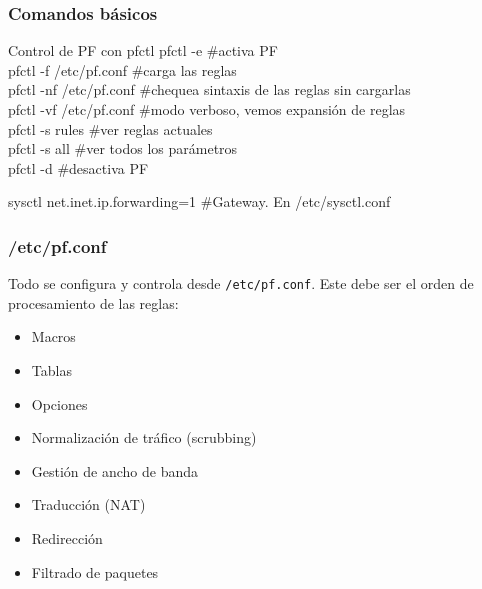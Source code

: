 \documentclass{beamer}
\begin{document}
\begin{frame}
\frametitle{Comandos básicos}


\begin{block}{Control de PF con pfctl}
\alert{pfctl -e} \hspace{4mm} \#activa PF  \\
\alert{pfctl -f /etc/pf.conf} \hspace{2mm} \#carga las reglas \\
\alert{pfctl -nf /etc/pf.conf} \#chequea sintaxis de las reglas sin cargarlas \\
\alert{pfctl -vf /etc/pf.conf} \#modo verboso, vemos expansión de reglas\\
\alert{pfctl -s rules} \hspace{2mm} \#ver reglas actuales \\
\alert{pfctl -s all} \hspace{2mm} \#ver todos los parámetros \\
\alert{pfctl -d} \hspace{2mm} \#desactiva PF

\alert{sysctl net.inet.ip.forwarding=1} \hspace{2mm} \#Gateway. En /etc/sysctl.conf \\

\end{block}

\end{frame}



\begin{frame}
\frametitle{/etc/pf.conf}

Todo se configura y controla desde \texttt{/etc/pf.conf}. Este debe ser el orden de procesamiento de las reglas:

\begin{itemize}
\item Macros
\item Tablas
\item Opciones
\item Normalización de tráfico (scrubbing)
\item Gestión de ancho de banda
\item Traducción (NAT)
\item Redirección
\item Filtrado de paquetes
\end{itemize}

\end{frame}
\end{document}
